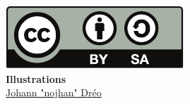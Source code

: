 \documentclass{beamer}
\begin{document}
\begin{frame}
\begin{center}
    \href{http://creativecommons.org/licenses/by-sa/2.0/fr/}{\includegraphics[width=.40\linewidth]{images/cc_by_sa}}
    \\[3em]
    \textbf{Illustrations}\\\medskip
    \href{http://commons.wikimedia.org/wiki/User:Nojhan}{Johann "nojhan" Dréo} 
\end{center}
\end{frame}
\end{document}
